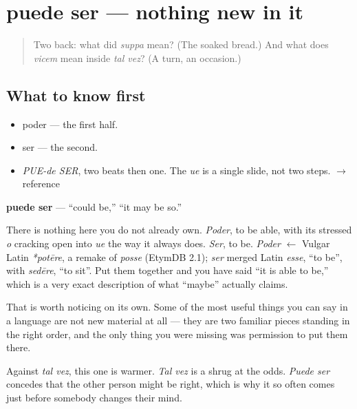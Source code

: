 \section[puede ser]{puede ser — nothing new in it}

\label{lesson:ES-C298-puede-ser}



\begin{quote}
Two back: what did \emph{suppa} mean? (The soaked bread.) And what does \emph{vicem} mean inside \emph{tal vez}? (A turn, an occasion.)
\end{quote}

\subsection*{What to know first}
\begin{itemize}
\raggedright
  \item poder — the first half.
  \item ser — the second.
\end{itemize}

\begin{sounds}
\begin{itemize}
\raggedright
  \item \emph{PUE-de SER}, two beats then one. The \emph{ue} is a single slide, not two steps. $\to$ reference
\end{itemize}
\end{sounds}

\begin{cousinweb}
\textbf{puede ser} — \textquotedblleft{}could be,\textquotedblright{} \textquotedblleft{}it may be so.\textquotedblright{}

There is nothing here you do not already own. \emph{Poder}, to be able, with its stressed \emph{o} cracking open into \emph{ue} the way it always does. \emph{Ser}, to be. \emph{Poder} $\leftarrow$ Vulgar Latin \emph{*potēre}, a remake of \emph{posse} (EtymDB 2.1); \emph{ser} merged Latin \emph{esse}, \textquotedblleft{}to be\textquotedblright{}, with \emph{sedēre}, \textquotedblleft{}to sit\textquotedblright{}. Put them together and you have said \textquotedblleft{}it is able to be,\textquotedblright{} which is a very exact description of what \textquotedblleft{}maybe\textquotedblright{} actually claims.

That is worth noticing on its own. Some of the most useful things you can say in a language are not new material at all — they are two familiar pieces standing in the right order, and the only thing you were missing was permission to put them there.

Against \emph{tal vez}, this one is warmer. \emph{Tal vez} is a shrug at the odds. \emph{Puede ser} concedes that the other person might be right, which is why it so often comes just before somebody changes their mind.
\end{cousinweb}


